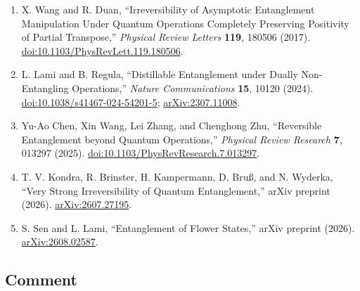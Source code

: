 \begin{enumerate}[label={},leftmargin=4.8em,labelsep=0.5em]
  \item[\textup{[WD17]}]\label{ref:09dc-wang-duan}
  X. Wang and R. Duan, ``Irreversibility of Asymptotic Entanglement
  Manipulation Under Quantum Operations Completely Preserving Positivity of
  Partial Transpose,'' \emph{Physical Review Letters} \textbf{119}, 180506
  (2017).
  \href{https://doi.org/10.1103/PhysRevLett.119.180506}{doi:10.1103/PhysRevLett.119.180506}.

  \item[\textup{[LR24]}]\label{ref:09dc-lami-regula}
  L. Lami and B. Regula, ``Distillable Entanglement under Dually
  Non-Entangling Operations,'' \emph{Nature Communications} \textbf{15},
  10120 (2024).
  \href{https://doi.org/10.1038/s41467-024-54201-5}{doi:10.1038/s41467-024-54201-5};
  \href{https://arxiv.org/abs/2307.11008}{arXiv:2307.11008}.

  \item[\textup{[CWZ+25]}]\label{ref:09dc-chen-et-al}
  Yu-Ao Chen, Xin Wang, Lei Zhang, and Chenghong Zhu, ``Reversible
  Entanglement beyond Quantum Operations,'' \emph{Physical Review Research}
  \textbf{7}, 013297 (2025).
  \href{https://doi.org/10.1103/PhysRevResearch.7.013297}{doi:10.1103/PhysRevResearch.7.013297}.

  \item[\textup{[KBK+26]}]\label{ref:09dc-kondra-et-al}
  T. V. Kondra, R. Brinster, H. Kampermann, D. Bru{\ss}, and N. Wyderka,
  ``Very Strong Irreversibility of Quantum Entanglement,'' arXiv preprint
  (2026).
  \href{https://arxiv.org/abs/2607.27195}{arXiv:2607.27195}.

  \item[\textup{[SL26]}]\label{ref:09dc-sen-lami}
  S. Sen and L. Lami, ``Entanglement of Flower States,'' arXiv preprint
  (2026).
  \href{https://arxiv.org/abs/2608.02587}{arXiv:2608.02587}.
\end{enumerate}

\subsection*{Comment}

